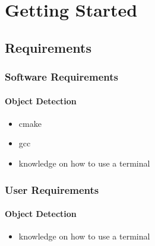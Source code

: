 \chapter{Getting Started}
\section{Requirements}
\subsection{Software Requirements}
\subsubsection{Object Detection}
\begin{itemize}
    \item cmake
    \item gcc
    \item knowledge on how to use a terminal
\end{itemize}

\subsection{User Requirements}
\subsubsection{Object Detection}
\begin{itemize}
    \item knowledge on how to use a terminal
\end{itemize}